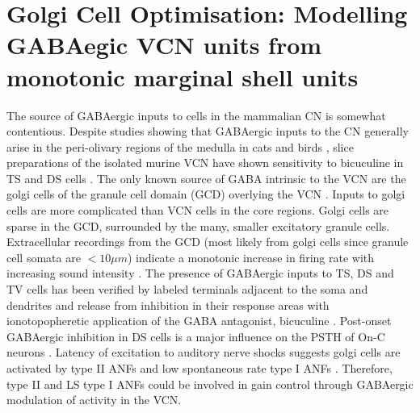 \documentclass{article}
\begin{document}

\section{Golgi Cell Optimisation: Modelling GABAegic VCN units from
  monotonic marginal shell units}



The source of GABAergic inputs to cells in the mammalian CN is somewhat
contentious. Despite studies showing that GABAergic inputs to the CN generally
arise in the peri-olivary regions of the medulla in cats
\citep{OstapoffBensonEtAl:1997} and birds
\citep{LachicaRubsamenEtAl:1995,YangMonsivaisEtAl:1999}, slice preparations of
the isolated murine VCN have shown sensitivity to bicuculine in TS and DS cells
\citep{FerragamoGoldingEtAl:1998a}.  The only known source of GABA intrinsic to
the VCN are the golgi cells of the granule cell domain (GCD) overlying the VCN
\citep[Fig.~\ref{fig:CNdiagram}]{Mugnaini:1985,FerragamoGoldingEtAl:1998}. Inputs
to golgi cells are more complicated than VCN cells in the core regions. Golgi
cells are sparse in the GCD, surrounded by the many, smaller excitatory granule
cells. Extracellular recordings from the GCD (most likely from golgi cells
since granule cell somata are $<10 \mu m$) indicate a monotonic increase in
firing rate with increasing sound intensity \citep{GhoshalKim:1997}. The
presence of GABAergic inputs to TS, DS and TV cells has been verified by
labeled terminals adjacent to the soma and dendrites
\citep{SmithRhode:1989,AwatramaniTurecekEtAl:2005,BabalianRyugoEtAl:2003} and
release from inhibition in their response areas with ionotopopheretic
application of the GABA antagonist, bicuculine
\citep{EvansZhao:1998,CasparyBackoffEtAl:1994,BackoffShadduckEtAl:1999,FerragamoGoldingEtAl:1998a}.
Post-onset GABAergic inhibition in DS cells is a major influence on the PSTH of
On-C neurons \citep{FerragamoGoldingEtAl:1998a,EvansZhao:1998}. Latency of
excitation to auditory nerve shocks suggests golgi cells are activated by type
II ANFs and low spontaneous rate type I ANFs
\citep{BensonBerglundEtAl:1996,FerragamoGoldingEtAl:1998}. Therefore, type II
and LS type I ANFs could be involved in gain control through GABAergic
modulation of activity in the VCN.
\end{document}
